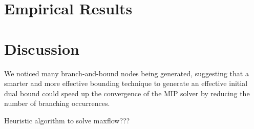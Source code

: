 \begin{comment}
In this thesis, we will use performance profiles extensively to measure each solver by exploiting two performance metrics: \textbf{Time metric}, \textbf{Cost metric}.

A \textbf{Time performance profile} will tell us which resolution method is the fastest in terms of runtime.
A \textbf{Cost performance profile}, instead, will show us the cost ratio of the best upper bound obtained from each resolution method.
The ground truth optimal, as extracted from the dataset, is used instead as the cost baseline.
\end{comment}

\section{Empirical Results}
\label{sec:results-empirical-results}

\section{Discussion}
\label{sec:results-discussion}


We noticed many branch-and-bound nodes being generated,
suggesting that a smarter and more effective bounding technique to
generate an effective initial dual bound could speed up the convergence
of the MIP solver by reducing the number of branching occurrences.

Heuristic algorithm to solve maxflow???
